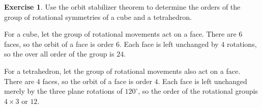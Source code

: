 \documentclass[11pt,oneside]{article}
\numberwithin{equation}{section}
\theoremstyle{definition}
\newtheorem{exercise}{Exercise}
\begin{document}
\begin{exercise}
  Use the orbit stabilizer theorem to determine the orders of the
  group of rotational symmetries of a cube and a tetrahedron.  
\end{exercise}
\begin{solution}
  For a cube, let the group of rotational movements act on a face.
  There are $6$ faces, so the orbit of a face is order $6$.  Each face is
  left unchanged by $4$ rotations, so the over all order of the group is $24$.

  For a tetrahedron, let the group of rotational movements also act on
  a face.  There are $4$ faces, so the orbit of a face is order $4$.
  Each face is left unchanged merely by the three plane rotations of
  $120 ^{\circ}$, so the order of the rotational groupis $4 \times 3$
  or $12$.
\end{solution}
\end{document}
